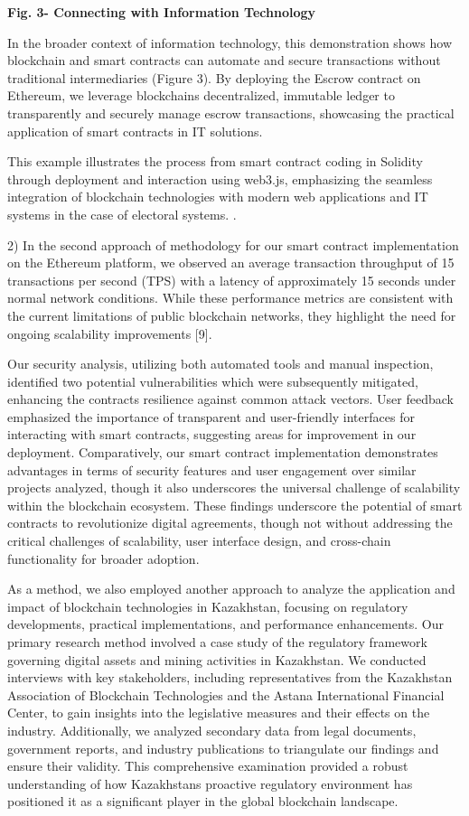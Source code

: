 \textbf{Fig. 3- Connecting with Information Technology}

In the broader context of information technology, this demonstration
shows how blockchain and smart contracts can automate and secure
transactions without traditional intermediaries (Figure 3). By deploying
the Escrow contract on Ethereum, we leverage
blockchain\textquotesingle s decentralized, immutable ledger to
transparently and securely manage escrow transactions, showcasing the
practical application of smart contracts in IT solutions.

This example illustrates the process from smart contract coding in
Solidity through deployment and interaction using web3.js, emphasizing
the seamless integration of blockchain technologies with modern web
applications and IT systems in the case of electoral systems. .

2) In the second approach of methodology for our smart contract
implementation on the Ethereum platform, we observed an average
transaction throughput of 15 transactions per second (TPS) with a
latency of approximately 15 seconds under normal network conditions.
While these performance metrics are consistent with the current
limitations of public blockchain networks, they highlight the need for
ongoing scalability improvements {[}9{]}.

Our security analysis, utilizing both automated tools and manual
inspection, identified two potential vulnerabilities which were
subsequently mitigated, enhancing the contract\textquotesingle s
resilience against common attack vectors. User feedback emphasized the
importance of transparent and user-friendly interfaces for interacting
with smart contracts, suggesting areas for improvement in our
deployment. Comparatively, our smart contract implementation
demonstrates advantages in terms of security features and user
engagement over similar projects analyzed, though it also underscores
the universal challenge of scalability within the blockchain ecosystem.
These findings underscore the potential of smart contracts to
revolutionize digital agreements, though not without addressing the
critical challenges of scalability, user interface design, and
cross-chain functionality for broader adoption.

As a method, we also employed another approach to analyze the
application and impact of blockchain technologies in Kazakhstan,
focusing on regulatory developments, practical implementations, and
performance enhancements. Our primary research method involved a case
study of the regulatory framework governing digital assets and mining
activities in Kazakhstan. We conducted interviews with key stakeholders,
including representatives from the Kazakhstan Association of Blockchain
Technologies and the Astana International Financial Center, to gain
insights into the legislative measures and their effects on the
industry. Additionally, we analyzed secondary data from legal documents,
government reports, and industry publications to triangulate our
findings and ensure their validity. This comprehensive examination
provided a robust understanding of how Kazakhstan\textquotesingle s
proactive regulatory environment has positioned it as a significant
player in the global blockchain landscape.

